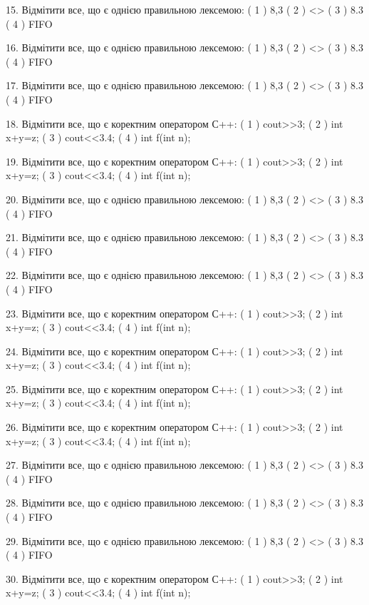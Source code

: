 \documentclass[11pt]{article}
\begin{document}
15. Відмітити все, що є однією правильною лексемою:
( 1 ) 8,3	
( 2 ) <>	
( 3 ) 8.3	
( 4 ) FIFO

16. Відмітити все, що є однією правильною лексемою:
( 1 ) 8,3	
( 2 ) <>	
( 3 ) 8.3	
( 4 ) FIFO

17. Відмітити все, що є однією правильною лексемою:
( 1 ) 8,3	
( 2 ) <>	
( 3 ) 8.3	
( 4 ) FIFO

18. Відмітити все, що є коректним оператором С++:
( 1 ) cout>>3;	
( 2 ) int x+y=z;	
( 3 ) cout<<3.4;	
( 4 ) int f(int n);

19. Відмітити все, що є коректним оператором С++:
( 1 ) cout>>3;	
( 2 ) int x+y=z;	
( 3 ) cout<<3.4;	
( 4 ) int f(int n);

20. Відмітити все, що є однією правильною лексемою:
( 1 ) 8,3	
( 2 ) <>	
( 3 ) 8.3	
( 4 ) FIFO

21. Відмітити все, що є однією правильною лексемою:
( 1 ) 8,3	
( 2 ) <>	
( 3 ) 8.3	
( 4 ) FIFO

22. Відмітити все, що є однією правильною лексемою:
( 1 ) 8,3	
( 2 ) <>	
( 3 ) 8.3	
( 4 ) FIFO

23. Відмітити все, що є коректним оператором С++:
( 1 ) cout>>3;	
( 2 ) int x+y=z;	
( 3 ) cout<<3.4;	
( 4 ) int f(int n);

24. Відмітити все, що є коректним оператором С++:
( 1 ) cout>>3;	
( 2 ) int x+y=z;	
( 3 ) cout<<3.4;	
( 4 ) int f(int n);

25. Відмітити все, що є коректним оператором С++:
( 1 ) cout>>3;	
( 2 ) int x+y=z;	
( 3 ) cout<<3.4;	
( 4 ) int f(int n);

26. Відмітити все, що є коректним оператором С++:
( 1 ) cout>>3;	
( 2 ) int x+y=z;	
( 3 ) cout<<3.4;	
( 4 ) int f(int n);

27. Відмітити все, що є однією правильною лексемою:
( 1 ) 8,3	
( 2 ) <>	
( 3 ) 8.3	
( 4 ) FIFO

28. Відмітити все, що є однією правильною лексемою:
( 1 ) 8,3	
( 2 ) <>	
( 3 ) 8.3	
( 4 ) FIFO

29. Відмітити все, що є однією правильною лексемою:
( 1 ) 8,3	
( 2 ) <>	
( 3 ) 8.3	
( 4 ) FIFO

30. Відмітити все, що є коректним оператором С++:
( 1 ) cout>>3;	
( 2 ) int x+y=z;	
( 3 ) cout<<3.4;	
( 4 ) int f(int n);































\newpage
\end{document}
